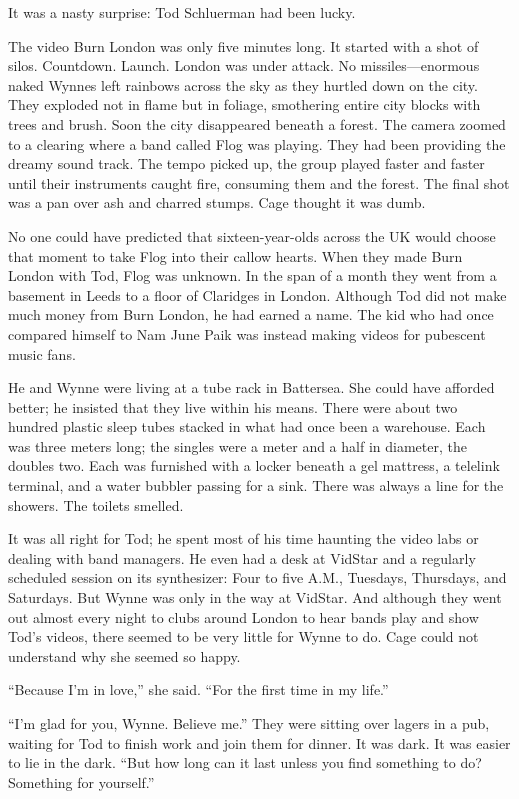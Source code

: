 It was a nasty surprise: Tod Schluerman had been lucky.

The video Burn London was only five minutes long. It started with a shot of silos. Countdown. Launch. London was under attack. No missiles---enormous naked Wynnes left rainbows across the sky as they hurtled down on the city. They exploded not in flame but in foliage, smothering entire city blocks with trees and brush. Soon the city disappeared beneath a forest. The camera zoomed to a clearing where a band called Flog was playing. They had been providing the dreamy sound track. The tempo picked up, the group played faster and faster until their instruments caught fire, consuming them and the forest. The final shot was a pan over ash and charred stumps. Cage thought it was dumb.

No one could have predicted that sixteen-year-olds across the UK would choose that moment to take Flog into their callow hearts. When they made Burn London with Tod, Flog was unknown. In the span of a month they went from a basement in Leeds to a floor of Claridges in London. Although Tod did not make much money from Burn London, he had earned a name. The kid who had once compared himself to Nam June Paik was instead making videos for pubescent music fans.

He and Wynne were living at a tube rack in Battersea. She could have afforded better; he insisted that they live within his means. There were about two hundred plastic sleep tubes stacked in what had once been a warehouse. Each was three meters long; the singles were a meter and a half in diameter, the doubles two. Each was furnished with a locker beneath a gel mattress, a telelink terminal, and a water bubbler passing for a sink. There was always a line for the showers. The toilets smelled.

It was all right for Tod; he spent most of his time haunting the video labs or dealing with band managers. He even had a desk at VidStar and a regularly scheduled session on its synthesizer: Four to five A.M., Tuesdays, Thursdays, and Saturdays. But Wynne was only in the way at VidStar. And although they went out almost every night to clubs around London to hear bands play and show Tod's videos, there seemed to be very little for Wynne to do. Cage could not understand why she seemed so happy.

``Because I'm in love,'' she said. ``For the first time in my life.''

``I'm glad for you, Wynne. Believe me.'' They were sitting over lagers in a pub, waiting for Tod to finish work and join them for dinner. It was dark. It was easier to lie in the dark. ``But how long can it last unless you find something to do? Something for yourself.''

